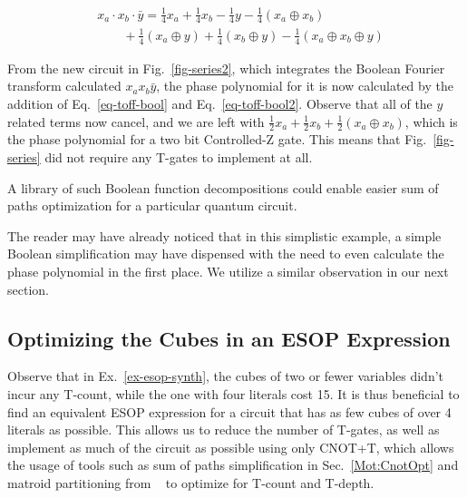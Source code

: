 \begin{equation}
  \label{eq-toff-bool2}
  \begin{aligned}
    &x_a \cdot x_b \cdot \bar{y} = \frac{1}{4}x_a + \frac{1}{4}x_b - \frac{1}{4}y
    - \frac{1}{4}(x_a \oplus x_b) \\
    &\qquad +\frac{1}{4}(x_a \oplus y) + \frac{1}{4}(x_b \oplus y)
    - \frac{1}{4}(x_a \oplus x_b \oplus y)
  \end{aligned}
\end{equation}

\begin{example}
  From the new circuit in Fig.~\ref{fig-series2}, which integrates the Boolean Fourier
  transform calculated $x_a x_b \bar{y}$, the phase polynomial for it
  is now calculated by the addition of Eq.~\ref{eq-toff-bool} and Eq.~\ref{eq-toff-bool2}.
  Observe that all of the $y$ related terms now cancel, and we are left with
  $\frac{1}{2}x_a + \frac{1}{2}x_b +\frac{1}{2}(x_a \oplus x_b)$, which is the
  phase polynomial for a two bit Controlled-Z gate. This means that Fig.~\ref{fig-series}
  did not require any T-gates to implement at all.
\end{example}

A library of such Boolean function decompositions could enable easier sum of paths
optimization for a particular quantum circuit.

The reader may have already noticed that in this simplistic example, a simple Boolean
simplification may have dispensed with the need to even calculate the phase polynomial
in the first place. We utilize a similar observation in our next section.


\subsection{Optimizing the Cubes in an ESOP Expression}
\label{Mot:Lib}

Observe that in Ex.~\ref{ex-esop-synth}, the cubes of two or fewer variables didn't incur
any T-count, while the one with four literals cost 15. It is thus beneficial to find
an equivalent ESOP expression for a circuit that has as few cubes of over 4 literals as
possible. This allows us to reduce the number of T-gates, as well as implement as much of
the circuit as possible using only CNOT+T, which allows the usage of tools such as
sum of paths simplification in Sec.~\ref{Mot:CnotOpt} and matroid partitioning from
~\cite{bib-amy-matroid} to optimize for T-count and T-depth.

